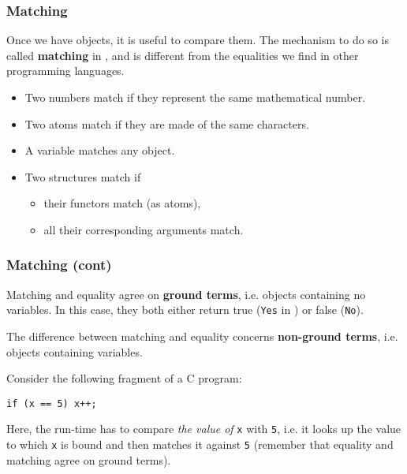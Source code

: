 
%
\begin{frame}
\frametitle{Matching}

Once we have objects, it is useful to compare them. The mechanism to
do so is called \textbf{matching} in \Prolog, and is different from
the equalities we find in other programming languages.
\begin{itemize}

  \item Two numbers match if they represent the same mathematical
    number.

  \item Two atoms match if they are made of the same characters.

  \item A variable matches any object.

  \item Two structures match if
    \begin{itemize}

    \item their functors match (as atoms),
      
    \item all their corresponding arguments match.
      
    \end{itemize}
\end{itemize}

\end{frame}

%
\begin{frame}[containsverbatim]
\frametitle{Matching (cont)}

Matching and equality agree on \textbf{ground terms}, i.e. objects
containing no variables. In this case, they both either return true
(\texttt{Yes} in \Prolog) or false (\texttt{No}).

\bigskip

The difference between matching and equality concerns
\textbf{non-ground terms}, i.e. objects containing variables.

\bigskip

Consider the following fragment of a C program:
{\small
\begin{verbatim}
if (x == 5) x++;
\end{verbatim}
} 
Here, the run-time has to compare \emph{the value of} \texttt{x} with
\texttt{5}, i.e. it looks up the value to which \texttt{x} is bound
and then matches it against \texttt{5} (remember that equality and
matching agree on ground terms).

\end{frame}

